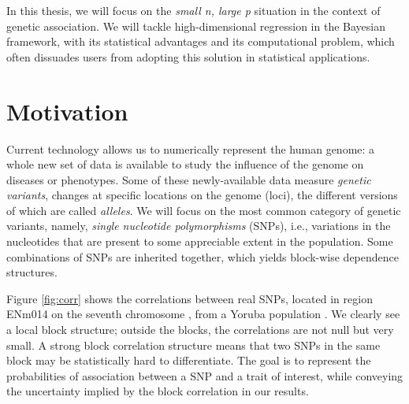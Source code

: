 \documentclass[a4paper, 11pt]{report}
\numberwithin{equation}{chapter}
\begin{document}
In this thesis, we will focus on the \textit{small n, large p} situation in the context of genetic association. We will tackle high-dimensional regression in the Bayesian framework, with its statistical advantages and its computational problem, which often dissuades users from adopting this solution in statistical applications.

\section{Motivation}
Current technology allows us to numerically represent the human genome: a whole new set of data is available to study the influence of the genome on diseases or phenotypes.  Some of these newly-available data measure \textit{genetic variants}, changes at specific locations on  the genome (loci), the different versions of which are called \textit{alleles}. We will focus on the most common category of genetic variants, namely, \textit{single nucleotide polymorphisms} (SNPs), i.e., variations in the nucleotides that are present to some appreciable extent in the population. Some combinations of SNPs are inherited together, which yields block-wise dependence structures.

Figure \ref{fig:corr} shows the correlations between real SNPs, located in region ENm014 on the seventh chromosome , from a Yoruba population \citep[][]{hapmap}. We clearly see a local block structure; outside the blocks, the correlations are not null but very small. A strong block correlation structure means that two SNPs in the same block may be statistically hard to differentiate. The goal is to represent the probabilities of association between a SNP and a trait of interest, while conveying the uncertainty implied by the block correlation in our results.
\end{document}
